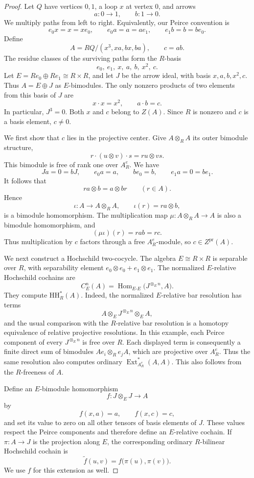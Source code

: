 \documentclass[12pt,a4paper,english,reqno]{amsart}
\numberwithin{equation}{section}
\theoremstyle{plain}
\theoremstyle{definition}
\begin{document}
\begin{proof}
Let $Q$ have vertices $0,1$, a loop $x$ at vertex $0$, and arrows
\[
 a:0\longrightarrow 1,
 \qquad
 b:1\longrightarrow 0.
\]
We multiply paths from left to right.  Equivalently, our Peirce
convention is
\[
 e_0x=x=xe_0,
 \qquad
 e_0a=a=ae_1,
 \qquad
 e_1b=b=be_0.
\]
Define
\[
 A=RQ/(x^3,xa,bx,ba),
 \qquad c=ab.
\]
The residue classes of the surviving paths form the $R$-basis
\[
 e_0,\ e_1,\ x,\ a,\ b,\ x^2,\ c.
\]
Let $E=Re_0\oplus Re_1\cong R\times R$, and let $J$ be the arrow
ideal, with basis $x,a,b,x^2,c$.  Thus $A=E\oplus J$ as
$E$-bimodules.  The only nonzero products of two elements from this
basis of $J$ are
\[
 x\cdot x=x^2,
 \qquad a\cdot b=c.
\]
In particular, $J^3=0$.  Both $x$ and $c$ belong to $Z(A)$.  Since $R$ is nonzero and $c$
is a basis element, $c\ne0$.

We first show that $c$ lies in the projective center.
Give $A\otimes_R A$ its outer bimodule structure,
\[
 r\cdot(u\otimes v)\cdot s=ru\otimes vs.
\]
This bimodule is free of rank one over $A^e_R$.  We have
\[
 Ja=0=bJ,
 \qquad e_0a=a,
 \qquad be_0=b,
 \qquad e_1a=0=be_1.
\]
It follows that
\[
 ra\otimes b=a\otimes br
 \qquad(r\in A).
\]
Hence
\[
 \iota:A\longrightarrow A\otimes_R A,
 \qquad \iota(r)=ra\otimes b,
\]
is a bimodule homomorphism.  The multiplication map
$\mu:A\otimes_R A\to A$ is also a bimodule homomorphism, and
\[
 (\mu\iota)(r)=rab=rc.
\]
Thus multiplication by $c$ factors through a free $A^e_R$-module, so
$c\in Z^{\mathrm{pr}}(A)$.

We next construct a Hochschild two-cocycle.  The algebra
$E\cong R\times R$ is separable over $R$, with
separability element $e_0\otimes e_0+e_1\otimes e_1$.  The normalized
$E$-relative Hochschild cochains are
\[
 C_E^n(A)=\operatorname{Hom}_{E\text{-}E}
       \bigl(J^{\otimes_E n},A\bigr).
\]
They compute $\mathrm{HH}^{*}_R(A)$.  Indeed, the normalized
$E$-relative bar resolution has terms
\[
 A\otimes_E J^{\otimes_E n}\otimes_E A,
\]
and the usual comparison with the $R$-relative bar resolution is a
homotopy equivalence of relative projective resolutions.  In this
example, each Peirce component of every $J^{\otimes_E n}$ is free
over $R$.  Each displayed term is consequently a finite direct sum
of bimodules $Ae_i\otimes_R e_jA$, which are projective over
$A^e_R$.  Thus the same resolution also computes ordinary
$\operatorname{Ext}^{*}_{A^e_R}(A,A)$.  This also follows from the $R$-freeness of $A$.

Define an $E$-bimodule homomorphism
\[
 f:J\otimes_E J\longrightarrow A
\]
by
\[
 f(x,a)=a,
 \qquad f(x,c)=c,
\]
and set its value to zero on all other tensors of basis elements
of $J$.  These values respect the Peirce components and therefore
define an $E$-relative cochain.
If $\pi:A\to J$ is the projection along $E$, the corresponding
ordinary $R$-bilinear Hochschild cochain is
\[
 \widetilde f(u,v)=f\bigl(\pi(u),\pi(v)\bigr).
\]
We use $f$ for this extension as well.


\end{proof}
\end{document}
